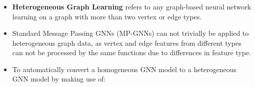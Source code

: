 \documentclass{beamer}
\begin{document}



% 



\begin{frame}
\frametitle{}

\begin{minipage}[c]{0.8\textwidth}
    \hspace{1cm}
    
\end{minipage}

\end{frame}


\begin{frame}[fragile]
\begin{itemize}
\frametitle{Heterogeneous Graph Learning}
[ball]

\item \textbf{Heterogeneous Graph Learning} refers to any graph-based neural network learning on a graph with more than two vertex or edge types.

\vspace{0.3cm}

\item Standard Message Passing GNNs (MP-GNNs) can not trivially be applied to heterogeneous graph data, as vertex and edge features from different types can not be processed by the same functions due to differences in feature type.

\vspace{0.3cm}

\item To automatically convert a homogeneous GNN model to a heterogeneous GNN model by making use of:



\end{itemize}
\end{frame}
\end{document}
